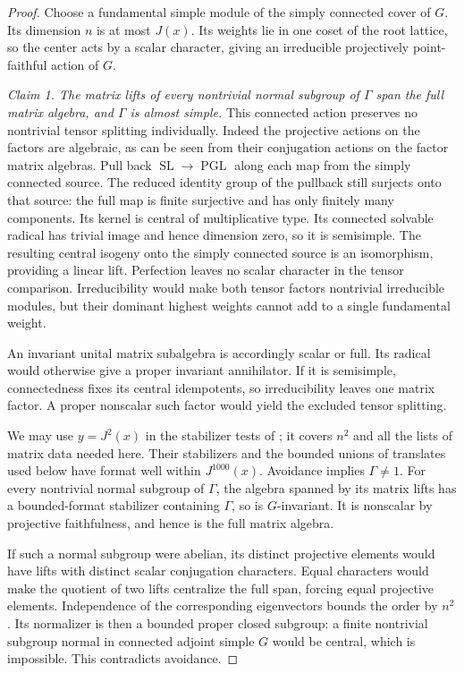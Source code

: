 \begin{proof}
Choose a fundamental simple module of the simply connected cover of $G$.
Its dimension $n$ is at most $J(x)$.  Its weights lie in one coset of the
root lattice, so the center acts by a scalar character, giving an
irreducible projectively point-faithful action of $G$.

\emph{Claim 1. The matrix lifts of every nontrivial normal subgroup of
$\Gamma$ span the full matrix algebra, and $\Gamma$ is almost simple.}
This connected action preserves no nontrivial tensor splitting individually.
Indeed the projective actions on the factors are algebraic, as can be seen
from their conjugation actions on the factor matrix algebras.  Pull back
$\operatorname{SL}\to\operatorname{PGL}$ along each map from the simply
connected source.  The reduced identity group of the pullback still
surjects onto that source: the full map is finite surjective and has only
finitely many components.  Its kernel is central of multiplicative type.
Its connected solvable radical has trivial image and hence dimension zero,
so it is semisimple.  The resulting central isogeny onto the simply
connected source is an isomorphism, providing a linear lift.  Perfection
leaves no scalar character in the tensor comparison.  Irreducibility would
make both tensor factors nontrivial irreducible modules, but their dominant
highest weights cannot add to a single fundamental weight.

An invariant unital matrix subalgebra is accordingly scalar or full.  Its
radical would otherwise give a proper invariant annihilator.  If it is
semisimple, connectedness fixes its central idempotents, so irreducibility
leaves one matrix factor.  A proper nonscalar such factor would yield the
excluded tensor splitting.

We may use $y=J^2(x)$ in the stabilizer tests of
; it covers $n^2$ and all the lists of matrix data
needed here.  Their stabilizers and the bounded unions of translates used
below have format well within $J^{1000}(x)$.  Avoidance implies
$\Gamma\ne1$.  For every nontrivial normal subgroup of $\Gamma$, the
algebra spanned by its matrix lifts has a bounded-format stabilizer
containing $\Gamma$, so is $G$-invariant.  It is nonscalar by projective
faithfulness, and hence is the full matrix algebra.

If such a normal subgroup were abelian, its distinct projective elements
would have lifts with distinct scalar conjugation characters.  Equal
characters would make the quotient of two lifts centralize the full span,
forcing equal projective elements.  Independence of the corresponding
eigenvectors bounds the order by $n^2$.  Its normalizer is then a bounded
proper closed subgroup: a finite nontrivial subgroup normal in connected
adjoint simple $G$ would be central, which is impossible.  This contradicts
avoidance.


\end{proof}
